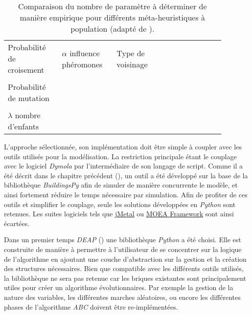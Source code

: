 \begin{table}
\begin{tabular}{L{0.22\linewidth} L{0.22\linewidth} L{0.22\linewidth} L{0.22\linewidth}}
    \\
    Probabilité de croisement                & $\alpha$ influence phéromones              & Type de voisinage               &                                                         \\
    \\
    Probabilité de mutation                  &                                            &                                 &                                                         \\
    \\
    $\lambda$ nombre d’enfants               &                                            &                                 &                                                         \\
    \bottomrule
\end{tabular}
\caption{Comparaison du nombre de paramètre à déterminer de manière empirique pour différents
         méta-heuristiques à population (adapté de \cite{Armand-Decker2015}).
         \label{tab:meta_compare}}
\end{table}

L’approche sélectionnée, son implémentation doit être simple à coupler avec les outils
utilisés pour la modélisation. La restriction principale étant le couplage avec
le logiciel \textit{Dymola} par l’intermédiaire de son langage de script. Comme il a été
décrit dans le chapitre précédent (), un outil a été
développé sur la base de la bibliothèque \textit{BuildingsPy} afin de simuler de manière
concurrente le modèle, et ainsi fortement réduire le temps nécessaire par
simulation. Afin de profiter de ces outils et simplifier le couplage, seule les
solutions développées en \textit{Python} sont retenues. Les suites logiciels tels que
\href{http://jmetal.sourceforge.net/index.html}{jMetal} ou
\href{http://moeaframework.org/index.html}{MOEA Framework} sont ainsi écartées.

Dans un premier temps \textit{DEAP} () une bibliothèque
\textit{Python} a été choisi. Elle est construite de manière à permettre à
l’utilisateur de se concentrer sur la logique de l’algorithme en ajoutant une
couche d’abstraction sur la gestion et la création des structures nécessaires.
Bien que compatible avec les différents outils utilisés, la bibliothèque ne sera
pas retenue car les briques existantes sont principalement utiles pour créer un
algorithme évolutionnaires. Par exemple la gestion de la nature des variables,
les différentes marches aléatoires, ou encore les différentes phases de
l’algorithme \textit{ABC} doivent être re-implémentées.

